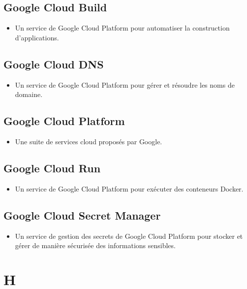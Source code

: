 \begin{multicols}{2}
    \subsection*{Google Cloud Build}
    \begin{itemize}
        \item Un service de Google Cloud Platform pour automatiser la construction d'applications.
    \end{itemize}

    \subsection*{Google Cloud DNS}
    \begin{itemize}
        \item Un service de Google Cloud Platform pour gérer et résoudre les noms de domaine.
    \end{itemize}

    \subsection*{Google Cloud Platform}
    \begin{itemize}
        \item Une suite de services cloud proposés par Google.
    \end{itemize}

    \subsection*{Google Cloud Run}
    \begin{itemize}
        \item Un service de Google Cloud Platform pour exécuter des conteneurs Docker.
    \end{itemize}

    \subsection*{Google Cloud Secret Manager}
    \begin{itemize}
        \item Un service de gestion des secrets de Google Cloud Platform pour stocker et gérer de manière sécurisée des informations sensibles.
    \end{itemize}

    \section*{H}


\end{multicols}
